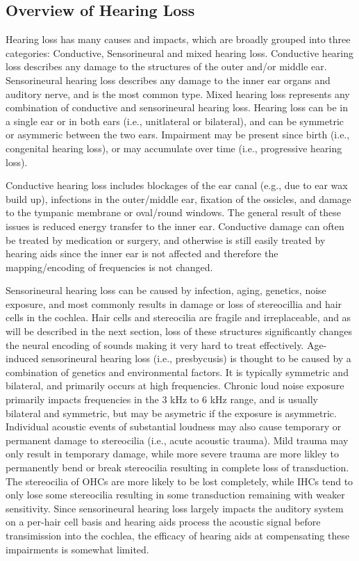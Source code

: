 \subsection{Overview of Hearing Loss}

Hearing loss has many causes and impacts, which are broadly grouped into three categories: Conductive, Sensorineural and mixed hearing loss. Conductive hearing loss describes any damage to the structures of the outer and/or middle ear. Sensorineural hearing loss describes any damage to the inner ear organs and auditory nerve, and is the most common type. Mixed hearing loss represents any combination of conductive and sensorineural hearing loss. Hearing loss can be in a single ear or in both ears (i.e., unitlateral or bilateral), and can be symmetric or asymmeric between the two ears. Impairment may be present since birth (i.e., congenital hearing loss), or may accumulate over time (i.e., progressive hearing loss).

Conductive hearing loss includes blockages of the ear canal (e.g., due to ear wax build up), infections in the outer/middle ear, fixation of the ossicles, and damage to the tympanic membrane or oval/round windows. The general result of these issues is reduced energy transfer to the inner ear. Conductive damage can often be treated by medication or surgery, and otherwise is still easily treated by hearing aids since the inner ear is not affected and therefore the mapping/encoding of frequencies is not changed.

Sensorineural hearing loss can be caused by infection, aging, genetics, noise exposure, and most commonly results in damage or loss of stereocillia and hair cells in the cochlea. Hair cells and stereocilia are fragile and irreplaceable, and as will be described in the next section, loss of these structures significantly changes the neural encoding of sounds making it very hard to treat effectively. Age-induced sensorineural hearing loss (i.e., presbycusis) is thought to be caused by a combination of genetics and environmental factors. It is typically symmetric and bilateral, and primarily occurs at high frequencies. Chronic loud noise exposure primarily impacts frequencies in the 3 kHz to 6 kHz range, and is usually bilateral and symmetric, but may be asymetric if the exposure is asymmetric. Individual acoustic events of substantial loudness may also cause temporary or permanent damage to stereocilia (i.e., acute acoustic trauma). Mild trauma may only result in temporary damage, while more severe trauma are more likley to permanently bend or break stereocilia resulting in complete loss of transduction. The stereocilia of OHCs are more likely to be lost completely, while IHCs tend to only lose some stereocilia resulting in some transduction remaining with weaker sensitivity. Since sensorineural hearing loss largely impacts the auditory system on a per-hair cell basis and hearing aids process the acoustic signal before transimission into the cochlea, the efficacy of hearing aids at compensating these impairments is somewhat limited.

